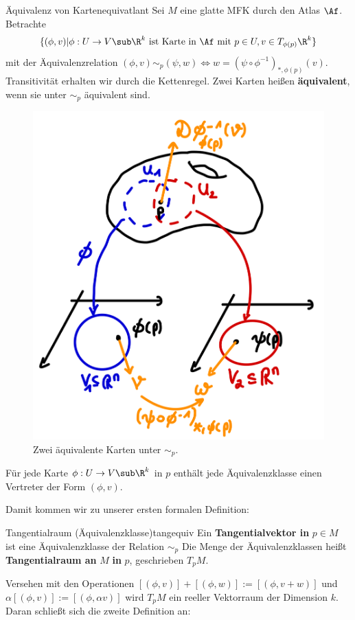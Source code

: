 \begin{definition}{Äquivalenz von Karten}{equivatlant}
Sei $M$ eine glatte MFK durch den Atlas $\Af$. Betrachte
\begin{equation}
\{(\phi, v) | \phi: U \to V \sub \R^k \ \text{ist Karte in} \ \Af \ \text{mit} \ p \in U, v \in T_{\phi(p)}\R^k \}
\end{equation}
mit der Äquivalenzrelation $(\phi, v) \sim_p (\psi, w) \iff w = (\psi \circ \phi^{-1})_{\ast, \phi(p)}(v)$. Transitivität erhalten wir durch die Kettenregel. Zwei Karten heißen \textbf{äquivalent}, wenn sie unter $\sim_p$ äquivalent sind.
\begin{figure}[H]
\label{fig:tangentialvek1}
\centering
\includegraphics[width=0.2\linewidth]{Bilder/tangentialvek1.png}
\caption{Zwei äquivalente Karten unter $\sim_p$.}
\end{figure}
\end{definition}
\begin{bemerkung}
Für jede Karte $\phi: U \to V \sub \R^k$ in $p$ enthält jede Äquivalenzklasse einen Vertreter der Form $(\phi, v)$.
\end{bemerkung}
Damit kommen wir zu unserer ersten formalen Definition:
\begin{definition}{Tangentialraum (Äquivalenzklasse)}{tangequiv}
Ein \textbf{Tangentialvektor in} $p \in M$ ist eine Äquivalenzklasse der Relation $\sim_p$ Die Menge der Äquivalenzklassen heißt \textbf{Tangentialraum an} $M$ \textbf{in} $p$, geschrieben $T_pM$.
\end{definition}
Versehen mit den Operationen $[(\phi, v)]+[(\phi, w)] := [(\phi, v+w)]$ und $\alpha [(\phi, v)] := [(\phi, \alpha v)]$ wird $T_pM$ ein reeller Vektorraum der Dimension $k$.\\
Daran schließt sich die zweite Definition an:
